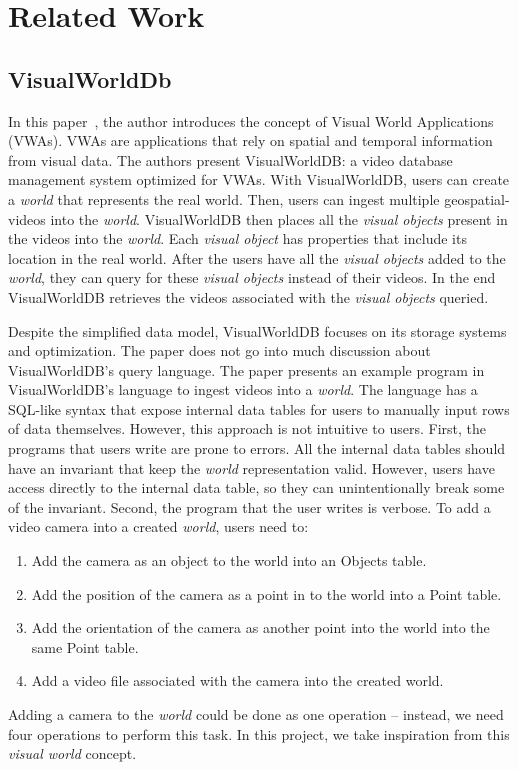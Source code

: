 
\section{Related Work}

\subsection{VisualWorldDb}
In this paper~\cite{haynes:visualworlddb}, the author introduces the concept of Visual World Applications (VWAs).
VWAs are applications that rely on spatial and temporal information from visual data.
The authors present VisualWorldDB: a video database management system optimized for VWAs.
With VisualWorldDB, users can create a \emph{world} that represents the real world.
Then, users can ingest multiple geospatial-videos into the \emph{world}.
VisualWorldDB then places all the \emph{visual objects} present in the videos into the \emph{world}.
Each \emph{visual object} has properties that include its location in the real world.
After the users have all the \emph{visual objects} added to the \emph{world},
they can query for these \emph{visual objects} instead of their videos.
In the end VisualWorldDB retrieves the videos associated with the \emph{visual objects} queried.

Despite the simplified data model, VisualWorldDB focuses on its storage systems and optimization.
The paper does not go into much discussion about VisualWorldDB's query language.
The paper presents an example program in VisualWorldDB's language to ingest videos into a \emph{world}.
The language has a SQL-like syntax that expose internal data tables for users to manually input rows of data themselves.
However, this approach is not intuitive to users.
First, the programs that users write are prone to errors.
All the internal data tables should have an invariant that keep the \emph{world} representation valid.
However, users have access directly to the internal data table,
so they can unintentionally break some of the invariant.
Second, the program that the user writes is verbose.
To add a video camera into a created \emph{world}, users need to:

\begin{enumerate}
    \item
    Add the camera as an object to the world into an Objects table.
    \item
    Add the position of the camera as a point in to the world into a Point table.
    \item
    Add the orientation of the camera as another point into the world into the same Point table.
    \item
    Add a video file associated with the camera into the created world.
\end{enumerate}
Adding a camera to the \emph{world} could be done as one operation --
instead, we need four operations to perform this task. In this project, we take inspiration from this \emph{visual world} concept.

